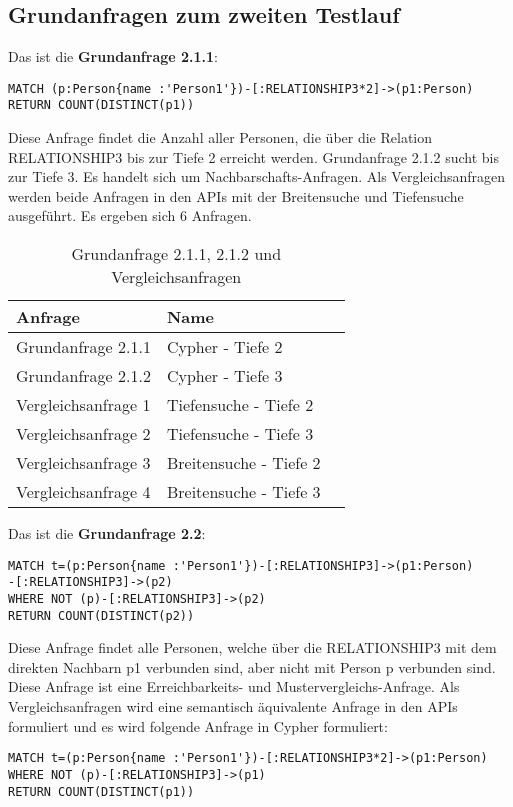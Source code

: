 \subsection{Grundanfragen zum zweiten Testlauf}
Das ist die \textbf{Grundanfrage 2.1.1}: 
\begin{Verbatim}[frame=single]
MATCH (p:Person{name :'Person1'})-[:RELATIONSHIP3*2]->(p1:Person) 
RETURN COUNT(DISTINCT(p1))
\end{Verbatim} 
Diese Anfrage findet die Anzahl aller Personen, die über die Relation RELATIONSHIP3 bis zur Tiefe 2 erreicht werden. Grundanfrage 2.1.2 sucht bis zur Tiefe 3. Es handelt sich um Nachbarschafts-Anfragen. Als Vergleichsanfragen werden beide Anfragen in den APIs mit der Breitensuche und Tiefensuche ausgeführt. Es ergeben sich 6 Anfragen.
\FloatBarrier
\begin{table}[h]
	\centering
	\begin{tabular}{ |p{5cm}||p{5cm}|p{3cm}  }
		\hline
		Anfrage& Name\\
		\hline
		Grundanfrage 2.1.1 &  Cypher - Tiefe 2\\
		Grundanfrage 2.1.2 &  Cypher - Tiefe 3\\
		Vergleichsanfrage 1 &  Tiefensuche - Tiefe 2\\
		Vergleichsanfrage 2 &  Tiefensuche - Tiefe 3\\
		Vergleichsanfrage 3 &  Breitensuche - Tiefe 2\\
		Vergleichsanfrage 4 &  Breitensuche - Tiefe 3\\
		\hline
	\end{tabular}
	\caption{Grundanfrage 2.1.1, 2.1.2 und Vergleichsanfragen}
	\label{tab:Intro_Query2_2}
\end{table}
\FloatBarrier
\noindent Das ist die \textbf{Grundanfrage 2.2}: 
\begin{Verbatim}[frame=single]
MATCH t=(p:Person{name :'Person1'})-[:RELATIONSHIP3]->(p1:Person)
-[:RELATIONSHIP3]->(p2)
WHERE NOT (p)-[:RELATIONSHIP3]->(p2) 
RETURN COUNT(DISTINCT(p2))
\end{Verbatim} 
Diese Anfrage findet alle Personen, welche über die RELATIONSHIP3 mit dem direkten Nachbarn  p1 verbunden sind, aber nicht mit Person p verbunden sind. Diese Anfrage ist eine Erreichbarkeits- und Mustervergleichs-Anfrage. Als Vergleichsanfragen wird eine semantisch äquivalente Anfrage in den APIs formuliert und es wird folgende Anfrage in Cypher formuliert:
\begin{Verbatim}[frame=single]
MATCH t=(p:Person{name :'Person1'})-[:RELATIONSHIP3*2]->(p1:Person)
WHERE NOT (p)-[:RELATIONSHIP3]->(p1)
RETURN COUNT(DISTINCT(p1))
\end{Verbatim} 
